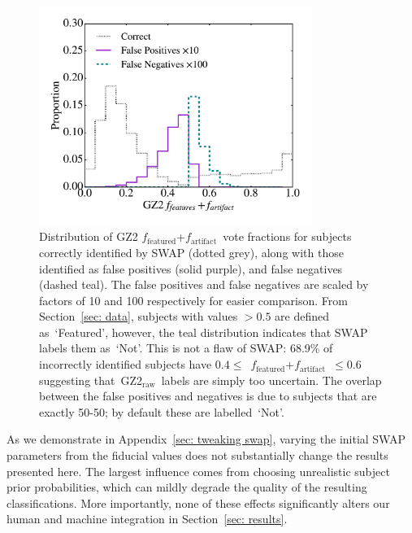 \documentclass[twocolumn, trackchanges, linenumbers]{aastex6}%
\newcommand{\feat}{`Featured'}
\newcommand{\notfeat}{`Not'}
\newcommand{\raw}{GZ2$_{\text{raw}}$}
\newcommand{\ffeat}{$f_{\mathrm{featured}}$}
\newcommand{\fstar}{$f_{\mathrm{artifact}}$}
\begin{document}


\begin{figure}[t!]
\includegraphics[width=3.5in]{f5.pdf}
\caption{Distribution of GZ2 \ffeat+\fstar~vote fractions for subjects correctly identified by SWAP (dotted grey), along with those identified as false positives (solid purple), and false negatives (dashed teal). 
The false positives and false negatives are scaled by factors of 10 and 100 respectively for easier comparison. From Section~\ref{sec: data}, subjects with values $> 0.5$ are defined as~\feat, however, the teal distribution indicates that SWAP labels them as~\notfeat. This is not a flaw of SWAP: 68.9\% of incorrectly identified subjects have $0.4 \le $~\ffeat +\fstar~$ \le 0.6$ suggesting that~\raw~labels are simply too uncertain. The overlap between the false positives and negatives is due to subjects that are exactly 50-50; by default these are labelled~\notfeat. \label{fig: SWAP sucks}}
\end{figure}

As we demonstrate in Appendix~\ref{sec: tweaking swap}, varying the initial SWAP 
parameters from the fiducial values does not substantially change the results 
presented here. The largest influence comes from choosing unrealistic subject 
prior probabilities, which can mildly degrade the quality of the resulting classifications. 
More importantly, none of these effects significantly alters our human and machine integration in Section~\ref{sec: results}. 
\end{document}
